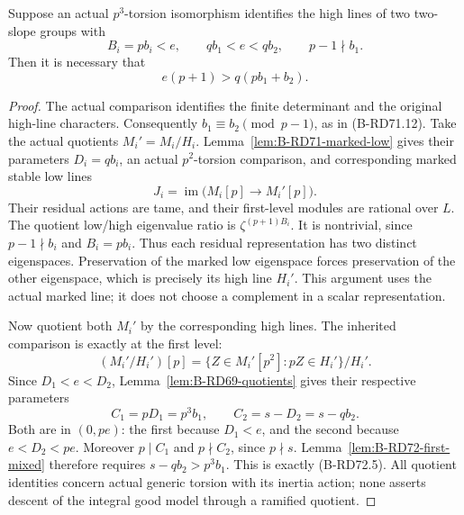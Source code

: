 \begin{proposition}
\label{prop:B-RD72-mixed-quotients}
Suppose an actual \(p^3\)-torsion isomorphism identifies the high
lines of two two-slope groups with
\[
 B_i=pb_i<e,\qquad qb_1<e<qb_2,\qquad p-1\nmid b_1.
 \tag{B-RD72.4}
\]
Then it is necessary that
\[
                    e(p+1)>q(pb_1+b_2).
 \tag{B-RD72.5}
\]
\end{proposition}
\begin{proof}
The actual comparison identifies the finite determinant and the
original high-line characters. Consequently
\(b_1\equiv b_2\pmod{p-1}\), as in (B-RD71.12).
Take the actual quotients \(M_i'=M_i/H_i\).
Lemma~\ref{lem:B-RD71-marked-low} gives their parameters
\(D_i=q b_i\), an actual \(p^2\)-torsion comparison, and
corresponding marked stable low lines
\[
 J_i=\operatorname{im}\bigl(M_i[p]\longrightarrow M_i'[p]\bigr).
 \tag{B-RD72.6}
\]
Their residual actions are tame, and their first-level modules are
rational over \(L\). The quotient low/high eigenvalue ratio is
\(\zeta^{(p+1)B_i}\). It is nontrivial, since
\(p-1\nmid b_i\) and \(B_i=pb_i\).
Thus each residual representation has two distinct eigenspaces.
Preservation of the marked low eigenspace forces preservation of
the other eigenspace, which is precisely its high line \(H_i'\).
This argument uses the actual marked line; it does not choose a
complement in a scalar representation.

Now quotient both \(M_i'\) by the corresponding high lines. The
inherited comparison is exactly at the first level:
\[
 (M_i'/H_i')[p]
   =\{Z\in M_i'[p^2]:pZ\in H_i'\}/H_i'.
 \tag{B-RD72.7}
\]
Since \(D_1<e<D_2\), Lemma~\ref{lem:B-RD69-quotients} gives
their respective parameters
\[
 C_1=pD_1=p^3b_1,
 \qquad C_2=s-D_2=s-qb_2.
 \tag{B-RD72.8}
\]
Both are in \((0,pe)\): the first because \(D_1<e\), and the
second because \(e<D_2<pe\). Moreover \(p\mid C_1\) and
\(p\nmid C_2\), since \(p\nmid s\).
Lemma~\ref{lem:B-RD72-first-mixed} therefore requires
\(s-qb_2>p^3b_1\). This is exactly (B-RD72.5).
All quotient identities concern actual generic torsion with its
inertia action; none asserts descent of the integral good model
through a ramified quotient.
\end{proof}

